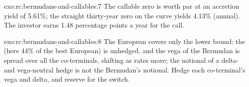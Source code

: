\begin{solution}{exo:rc:bermudans-and-callables:7}
The callable zero is worth par at an accretion yield of 5.61\%; the straight
thirty-year zero on the curve yields 4.13\% (annual). The investor earns 1.48
percentage points a year for the call.
\end{solution}

\begin{solution}{exo:rc:bermudans-and-callables:8}
The European covers only the lower bound: the  (here 44\% of the
best European) is unhedged, and the vega of the Bermudan is spread over all the
co-terminals, shifting as rates move; the notional of a delta- and vega-neutral
hedge is not the Bermudan's notional. Hedge each co-terminal's vega and delta, and
reserve for the switch.
\end{solution}

